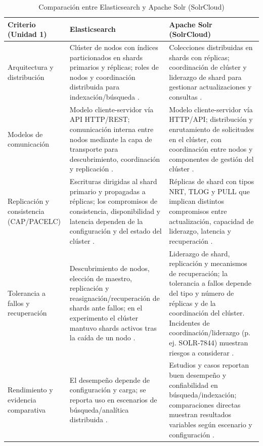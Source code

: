 \documentclass[12pt,a4paper]{article}
\begin{document}
\begin{table}[H]
\centering
\caption{Comparación entre Elasticsearch y Apache Solr (SolrCloud)}
\label{tab:comparativo}
\small
\renewcommand{\arraystretch}{1.25}
\begin{tabular}{|p{3.2cm}|p{5.5cm}|p{5.5cm}|}
\hline
\textbf{Criterio (Unidad 1)} & \textbf{Elasticsearch} & \textbf{Apache Solr (SolrCloud)} \\
\hline
Arquitectura y distribución & Clúster de nodos con índices particionados en shards primarios y réplicas; roles de nodos y coordinación distribuida para indexación/búsqueda \cite{elastic_distributed_architecture,elastic_nodes_shards,cheresharov-2026}. & Colecciones distribuidas en shards con réplicas; coordinación de clúster y liderazgo de shard para gestionar actualizaciones y consultas \cite{solr_shards_indexing,solr_distributed_requests}. \\
\hline
Modelos de comunicación & Modelo cliente-servidor vía API HTTP/REST; comunicación interna entre nodos mediante la capa de transporte para descubrimiento, coordinación y replicación \cite{elastic_distributed_architecture,elastic_read_write,elastic_discovery}. & Modelo cliente-servidor vía HTTP/API; distribución y enrutamiento de solicitudes en el clúster, con coordinación entre nodos y componentes de gestión del clúster \cite{solr_distributed_requests,solr_shards_indexing}. \\
\hline
Replicación y consistencia (CAP/PACELC) & Escrituras dirigidas al shard primario y propagadas a réplicas; los compromisos de consistencia, disponibilidad y latencia dependen de la configuración y del estado del clúster \cite{elastic_read_write,elastic_resilience}. & Réplicas de shard con tipos NRT, TLOG y PULL que implican distintos compromisos entre actualización, capacidad de liderazgo, latencia y recuperación \cite{solr_shards_indexing,solr_recoveries}. \\
\hline
Tolerancia a fallos y recuperación & Descubrimiento de nodos, elección de maestro, replicación y reasignación/recuperación de shards ante fallos; en el experimento el clúster mantuvo shards activos tras la caída de un nodo \cite{elastic_discovery,elastic_resilience,elastic_nodes_shards}. & Liderazgo de shard, replicación y mecanismos de recuperación; la tolerancia a fallos depende del tipo y número de réplicas y de la coordinación del clúster. Incidentes de coordinación/liderazgo (p. ej. SOLR-7844) muestran riesgos a considerar \cite{solr_shards_indexing,solr_recoveries,solr_jira_7844}. \\
\hline
Rendimiento y evidencia comparativa & El desempeño depende de configuración y carga; se reporta uso en escenarios de búsqueda/analítica distribuida \cite{cheresharov-2026,feraru-2026,calderon-2023}. & Estudios y casos reportan buen desempeño y confiabilidad en búsqueda/indexación; comparaciones directas muestran resultados variables según escenario y configuración \cite{deniz-2023,unger-2023,lu-2026}. \\
\hline
\end{tabular}
\end{table}
\end{document}
